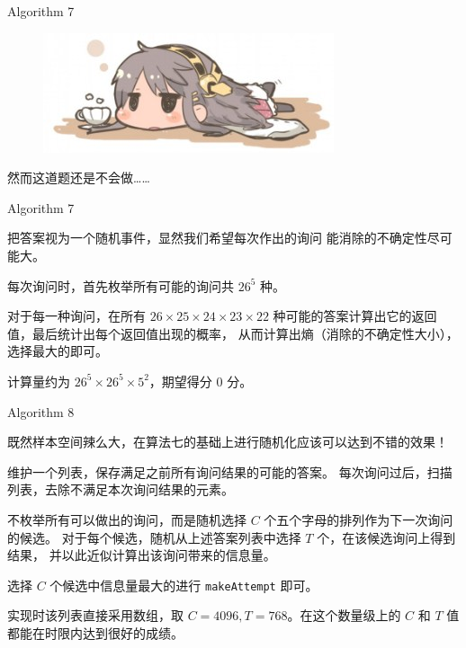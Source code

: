 \documentclass[UTF8]{beamer}
\begin{document}
\begin{frame}{Algorithm 7}

\begin{figure}[h]\centering
\includegraphics[scale=0.5]{vv.jpg}
\end{figure}

然而这道题还是不会做……

\end{frame}

\begin{frame}{Algorithm 7}

把答案视为一个随机事件，显然我们希望每次作出的询问%
能消除的不确定性尽可能大。

\pause
每次询问时，首先枚举所有可能的询问共 $26^5$ 种。

对于每一种询问，在所有 $26 \times 25 \times 24 \times 23 \times 22$%
种可能的答案计算出它的返回值，最后统计出每个返回值出现的概率，%
从而计算出熵（消除的不确定性大小），选择最大的即可。

\pause 计算量约为 $26^5 \times 26^5 \times 5^2$，期望得分 0 分。

\end{frame}

\begin{frame}{Algorithm 8}

既然样本空间辣么大，在算法七的基础上进行随机化应该可以达到不错的效果！

\pause
维护一个列表，保存满足之前所有询问结果的可能的答案。%
每次询问过后，扫描列表，去除不满足本次询问结果的元素。

\pause
不枚举所有可以做出的询问，而是随机选择 $C$ 个五个字母的排列作为下一次询问的候选。%
对于每个候选，随机从上述答案列表中选择 $T$ 个，在该候选询问上得到结果，%
并以此近似计算出该询问带来的信息量。

选择 $C$ 个候选中信息量最大的进行 \texttt{makeAttempt} 即可。

\pause
实现时该列表直接采用数组，取 $C = 4096, T = 768$。在这个数量级上的 %
$C$ 和 $T$ 值都能在时限内达到很好的成绩。

\end{frame}
\end{document}
